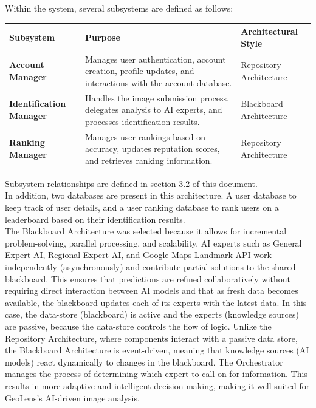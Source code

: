 \documentclass[]{article}
\begin{document}
\noindent Within the system, several subsystems are defined as follows:\\

\renewcommand{\arraystretch}{1.3} %
\begin{table}[h]
    \begin{tabular}{|p{4cm}|p{7cm}|p{4cm}|} 
        \hline
        \textbf{Subsystem} & \textbf{Purpose} & \textbf{Architectural Style} \\
        \hline
        \textbf{Account Manager} & Manages user authentication, account creation, profile updates, and interactions with the account database. & 
        Repository Architecture \\
        \hline
        \textbf{Identification Manager} & Handles the image submission process, delegates analysis to AI experts, and processes identification results. & Blackboard Architecture \\
        \hline
        \textbf{Ranking Manager} & Manages user rankings based on accuracy, updates reputation scores, and retrieves ranking information. & Repository Architecture \\
        \hline
    \end{tabular}
\end{table}

\noindent Subsystem relationships are defined in section 3.2 of this document.\\

\noindent In addition, two databases are present in this architecture. A user database to keep track of user details, and a user ranking database to rank users on a leaderboard based on their identification results.\\

\noindent The Blackboard Architecture was selected because it allows for incremental problem-solving, parallel processing, and scalability. AI experts such as General Expert AI, Regional Expert AI, and Google Maps Landmark API work independently (asynchronously) and contribute partial solutions to the shared blackboard. This ensures that predictions are refined collaboratively without requiring direct interaction between AI models and that as fresh data becomes available, the blackboard updates each of its experts with the latest data. In this case, the data-store (blackboard) is active and the experts (knowledge sources) are passive, because the data-store controls the flow of logic. Unlike the Repository Architecture, where components interact with a passive data store, the Blackboard Architecture is event-driven, meaning that knowledge sources (AI models) react dynamically to changes in the blackboard. The Orchestrator manages the process of determining which expert to call on for information. This results in more adaptive and intelligent decision-making, making it well-suited for GeoLens’s AI-driven image analysis.\\
\end{document}
